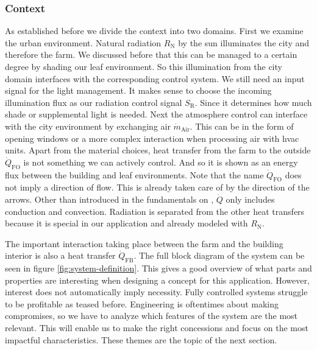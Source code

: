 

\subsubsection{Context}
As established before we divide the context into two domains.
First we examine the urban environment.
Natural radiation $R_\text{N}$ by the sun illuminates the city and therefore the farm.
We discussed before that this can be managed to a certain degree by shading our leaf environment.
So this illumination from the city domain interfaces with the corresponding control system.
We still need an input signal for the light management.
It makes sense to choose the incoming illumination flux as our radiation control signal $S_\text{R}$.
Since it determines how much shade or supplemental light is needed.
Next the atmosphere control can interface with the city environment by exchanging air $\dot{m}_{\text{Air}}$.
This can be in the form of opening windows or a more complex interaction when processing air with \ac{hvac} units.
Apart from the material choices, heat transfer from the farm to the outside $\dot{Q}_{\text{FO}}$ is not something we can actively control.
And so it is shown as an energy flux between the building and leaf environments.
Note that the name $\dot{Q}_{\text{FO}}$ does not imply a direction of flow.
This is already taken care of by the direction of the arrows.
Other than introduced in the fundamentals on , $\dot{Q}$ only includes conduction and convection.
Radiation is separated from the other heat transfers because it is special in our application and already modeled with $R_\text{N}$.

The important interaction taking place between the farm and the building interior is also a heat transfer $\dot{Q}_{\text{FB}}$.
The full block diagram of the system can be seen in figure \ref{fig:system-definition}.
This gives a good overview of what parts and properties are interesting when designing a concept for this application.
However, interest does not automatically imply necessity.
Fully controlled systems struggle to be profitable as teased before.
Engineering is oftentimes about making compromises, so we have to analyze which features of the system are the most relevant.
This will enable us to make the right concessions and focus on the most impactful characteristics.
These themes are the topic of the next section.

